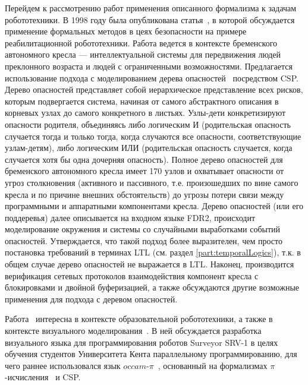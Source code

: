 \documentclass[a4, 14pt]{article}
\begin{document}
Перейдем к рассмотрению работ применения описанного формализма к задачам 
робототехники. В 1998 году была опубликована статья~\cite{lankenau1999formal}, 
в которой обсуждается применение формальных методов в цеях безопасности на 
примере реабилитационной робототехники. Работа ведется в контексте бременского 
автономного кресла --- интеллектуальной системы для передвижения людей преклонного 
возраста и людей с ограниченными возможностями. Предлагается использование 
подхода с моделированием дерева опасностей~\cite{vesely1981fault, hansen1996linking} 
посредством CSP. Дерево опасностей представляет собой иерархическое представление 
всех рисков, которым подвергается система, начиная от самого абстрактного описания 
в корневых узлах до самого конкретного в листьях. Узлы-дети конкретизируют опасности 
родителя, объединяясь либо логическим И (родительская опасность случается тогда 
и только тогда, когда случаются все опасности, соответствующие узлам-детям), 
либо логическим ИЛИ (родительская опасность случается, когда случается хотя бы 
одна дочерняя опасность). Полное дерево опасностей для 
бременского автономного кресла имеет 170 узлов и охватывает опасности от угроз 
столкновения (активного и пассивного, т.е. произошедших по вине самого кресла 
и по причине внешних обстоятельств) до угрозы потери связи между программными 
и аппаратными компонентами кресла. Дерево опасностей (или его поддеревья) далее 
описывается на входном языке FDR2, происходит моделирование окружения и системы 
со случайными выработками событий опасностей. Утверждается, что такой подход 
более выразителен, чем просто постановка требований в терминах LTL (см. раздел 
\ref{part:temporalLogics}), т.к. в общем случае дерево опасностей не выражается 
в LTL. Наконец, производится верификация сетевых протоколов взаимодействия 
компонент кресла с блокировками и двойной буферизацией, а также обсуждаются 
другие возможные применения для подхода с деревом опасностей.

Работа~\cite{simpson2008visual} интересна в контексте образовательной 
робототехники, а также в контексте визуального моделирования~\cite{koznov2008basics}. В ней обсуждается 
разработка визуального языка для программирования роботов Surveyor SRV-1
в целях обучения студентов Университета Кента параллельному программированию, 
для чего раннее использовался язык $occam\mbox{-}\pi$~\cite{welch2005communicating}, 
основанный на формализмах $\pi$-исчисления~\cite{welch2005communicating} и CSP.
\end{document}
